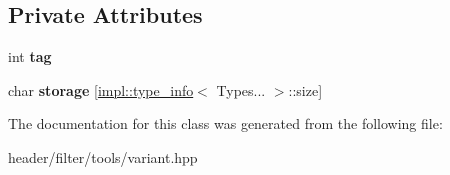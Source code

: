 \subsection*{Private Attributes}
\begin{DoxyCompactItemize}
\item 
\mbox{\label{classvariant_abbea1c647f8e1a132b8bdc3d5d24e725}} 
int {\bfseries tag}
\item 
\mbox{\label{classvariant_a6114ca264bb2f62573981973d8a7011b}} 
char {\bfseries storage} \mbox{[}\hyperlink{structimpl_1_1type__info}{impl\+::type\+\_\+info}$<$ Types... $>$\+::size\mbox{]}
\end{DoxyCompactItemize}


The documentation for this class was generated from the following file\+:\begin{DoxyCompactItemize}
\item 
header/filter/tools/variant.\+hpp\end{DoxyCompactItemize}
